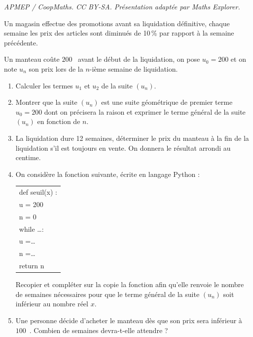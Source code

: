 \documentclass[10pt]{article}
\providecommand{\euro}{\texteuro}
\providecommand{\euro}{{\text{€}}}
\providecommand{\dotfill}{\ldots}
\renewcommand{\euro}{\ifmmode\text{\texteuro}\else\texteuro\fi}
\begin{document}
\noindent\textit{APMEP / CoopMaths. CC BY-SA. Présentation adaptée par Maths Explorer.}\par\medskip
\medskip

Un magasin effectue des promotions avant sa liquidation définitive, chaque semaine les prix des articles sont diminués  de 10\,\% par rapport à la semaine précédente. 

Un manteau coûte $200$~\euro{} avant le début de la liquidation, on pose $u_0=200$ et on note $u_n$ son prix lors de la $n$-ième semaine de liquidation.

\medskip

\begin{enumerate}
\item Calculer les termes $u_1$ et $u_2$ de la suite $(u_n)$.
\item Montrer que la suite $\left(u_n\right)$ est une suite géométrique de premier terme $u_0=200$ dont on précisera la raison et exprimer le terme général de la suite $\left(u_n\right)$ en fonction de $n$.
\item La liquidation dure 12 semaines, déterminer le prix du manteau à la fin de la liquidation s'il est toujours en vente. On donnera le résultat arrondi au centime.
\item On considère la fonction suivante, écrite en langage Python :

\begin{center}
\begin{tabular}[]{m{2.5cm}}
def seuil(x) :\\
\hspace{1.2em}u = 200\\
\hspace{1.2em}n = 0\\
 \hspace{1.2em}while \dotfill:\\
\hspace{2.5em}u =\dotfill\\
 \hspace{2.5em}n =\dotfill\\
\hspace{1.2em}return n\\
\end{tabular}
\end{center}

Recopier et compléter sur la copie la fonction afin qu'elle renvoie le nombre de semaines nécessaires pour que le terme général de la suite $\left(u_n\right)$ soit inférieur au nombre réel $x$.
\item Une personne décide d'acheter le manteau dès que son prix sera inférieur à $100$~\euro. Combien de semaines devra-t-elle attendre ?
\end{enumerate}

\vspace{0,5cm}
\end{document}
